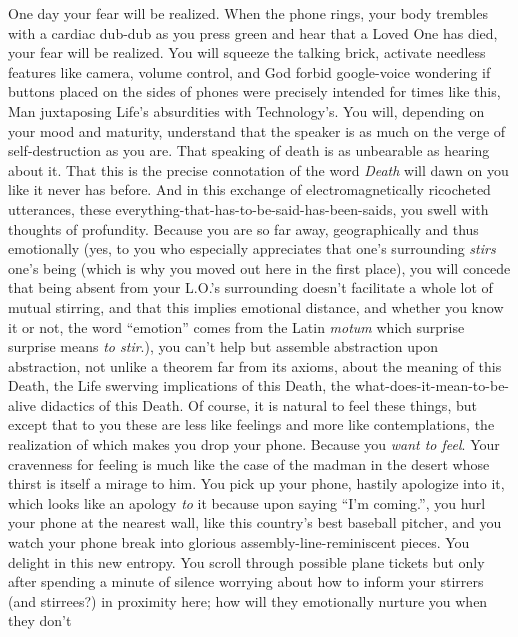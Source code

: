 \documentclass{article}
\begin{document}
\newline

One day your fear will be realized. When the phone rings, your body
trembles with a cardiac dub-dub as you press green and hear that a Loved
One has died, your fear will be realized. You will squeeze the talking
brick, activate needless features like camera, volume control, and God
forbid google-voice wondering if buttons placed on the sides of phones
were precisely intended for times like this, Man juxtaposing Life's
absurdities with Technology's. You will, depending on your mood and
maturity, understand that the speaker is as much on the verge of
self-destruction as you are. That speaking of death is as unbearable as
hearing about it. That this is the precise connotation of the word
\textit{Death} will dawn on you like it never has before. And in this
exchange of electromagnetically ricocheted utterances, these
everything-that-has-to-be-said-has-been-saids, you swell with thoughts
of profundity. Because you are so far away, geographically and thus
emotionally (yes, to you who especially appreciates that one's
surrounding \textit{stirs} one's being (which is why you moved out here
in the first place), you will concede that being absent from your L.O.'s
surrounding doesn't facilitate a whole lot of mutual stirring, and that
this implies emotional distance, and whether you know it or not, the
word ``emotion'' comes from the Latin \textit{motum} which surprise
surprise means \textit{to stir}.), you can't help but assemble
abstraction upon abstraction, not unlike a theorem far
from its axioms, about the meaning of this Death, the Life swerving
implications of this Death, the what-does-it-mean-to-be-alive didactics
of this Death. Of course, it is natural to feel these things, but except
that to you these are less like feelings and more like contemplations,
the realization of which makes you drop your phone. Because you
\textit{want to feel}. Your cravenness for feeling is much like the case
of the madman in the desert whose thirst is itself a mirage to him. You
pick up your phone, hastily apologize into it, which looks like an
apology \textit{to} it because upon saying ``I'm coming.'', you hurl
your phone at the nearest wall, like this country's best baseball
pitcher, and you watch your phone break into glorious
assembly-line-reminiscent pieces. You delight in this new entropy. You
scroll through possible plane tickets but only after spending a minute
of silence worrying about how to inform your stirrers (and stirrees?) in
proximity here; how will they emotionally nurture you when they don't
\end{document}
